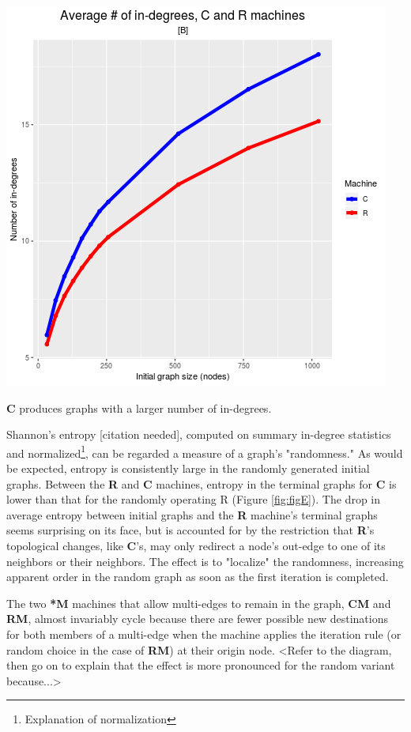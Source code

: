 \documentclass{tufte-handout}
\begin{document}
\begin{marginfigure}
  \includegraphics{figB.png}
  \caption{\textbf{C} produces graphs with a larger number of in-degrees.}
  \label{fig:figB}
\end{marginfigure}

Shannon's entropy [citation needed], computed on summary in-degree statistics and
normalized\footnote{Explanation of normalization}, can be regarded a measure of
a graph's "randomness."
As would be expected, entropy is consistently large in the randomly generated
initial graphs. Between the \textbf{R} and \textbf{C} machines, entropy in the terminal
graphs for \textbf{C} is lower than that for the randomly operating R (Figure \ref{fig:figE}).
The drop in average entropy between initial graphs and the \textbf{R} machine's terminal
graphs seems surprising on its face, but is accounted for by the restriction that
\textbf{R}'s topological changes, like \textbf{C}'s, may only redirect a node's out-edge
to one of its neighbors or their neighbors.
The effect is to "localize" the randomness, increasing apparent order in the random graph as
soon as the first iteration is completed.

The two \textbf{*M} machines that allow multi-edges to remain in the graph, \textbf{CM} and
\textbf{RM}, almost invariably cycle because there are fewer possible new destinations for
both members of a multi-edge when the machine applies the iteration rule (or random choice
in the case of \textbf{RM}) at their origin node. <Refer to the diagram, then go on to
explain that the effect is more pronounced for the random variant because...>
\end{document}

